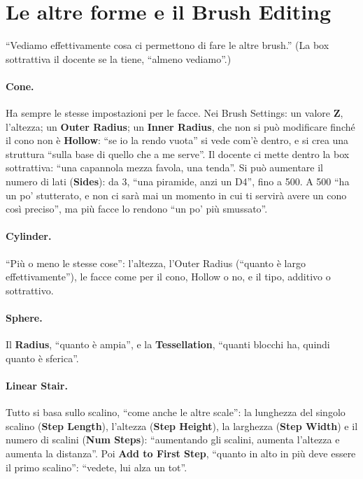 \section{Le altre forme e il Brush Editing}
\label{ue13:sec:forme}

``Vediamo effettivamente cosa ci permettono di fare le altre brush.'' (La box sottrattiva il
docente se la tiene, ``almeno vediamo''.)

\paragraph{Cone.} Ha sempre le stesse impostazioni per le facce. Nei Brush Settings: un
valore \textbf{Z}, l'altezza; un \textbf{Outer Radius}; un \textbf{Inner Radius}, che non
si può modificare finché il cono non è \textbf{Hollow}: ``se io la rendo vuota'' si vede
com'è dentro, e si crea una struttura ``sulla base di quello che a me serve''. Il docente ci
mette dentro la box sottrattiva: ``una capannola mezza favola, una tenda''. Si può aumentare
il numero di lati (\textbf{Sides}): da 3, ``una piramide, anzi un D4'', fino a 500. A 500
``ha un po' stutterato, e non ci sarà mai un momento in cui ti servirà avere un cono così
preciso'', ma più facce lo rendono ``un po' più smussato''.

\paragraph{Cylinder.} ``Più o meno le stesse cose'': l'altezza, l'Outer Radius (``quanto è
largo effettivamente''), le facce come per il cono, Hollow o no, e il tipo, additivo o
sottrattivo.

\paragraph{Sphere.} Il \textbf{Radius}, ``quanto è ampia'', e la \textbf{Tessellation},
``quanti blocchi ha, quindi quanto è sferica''.

\paragraph{Linear Stair.} Tutto si basa sullo scalino, ``come anche le altre scale'': la
lunghezza del singolo scalino (\textbf{Step Length}), l'altezza (\textbf{Step Height}), la
larghezza (\textbf{Step Width}) e il numero di scalini (\textbf{Num Steps}): ``aumentando
gli scalini, aumenta l'altezza e aumenta la distanza''. Poi \textbf{Add to First Step},
``quanto in alto in più deve essere il primo scalino'': ``vedete, lui alza un tot''.

